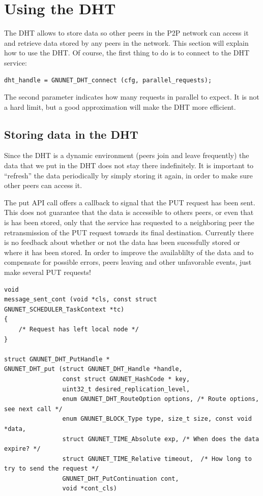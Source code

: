 \documentclass[10pt]{article}
\begin{document}
\section{Using the DHT}
The DHT allows to store data so other peers in the P2P network can
access it and retrieve data stored by any peers in the network.
This section will explain how to use the DHT. Of course, the first
thing to do is to connect to the DHT service:
\lstset{language=C}
\begin{lstlisting}
dht_handle = GNUNET_DHT_connect (cfg, parallel_requests);
\end{lstlisting}
The second parameter indicates how many requests in parallel to expect.
It is not a hard limit, but a good approximation will make the DHT more
efficient.

\subsection{Storing data in the DHT}
Since the DHT is a dynamic environment (peers join and leave frequently)
the data that we put in the DHT does not stay there indefinitely. It is
important to ``refresh'' the data periodically by simply storing it again,
in order to make sure other peers can access it.

The put API call offers a callback to signal that the PUT request has been
sent. This does not guarantee that the data is accessible to others peers,
or even that is has been stored, only that the service has requested to
a neighboring peer the retransmission of the PUT request towards its final
destination. Currently there is no feedback about whether or not the data
has been sucessfully stored or where it has been stored. In order to improve
the availablilty of the data and to compensate for possible errors, peers leaving
and other unfavorable events, just make several PUT requests!

\lstset{language=C}
\begin{lstlisting}
void
message_sent_cont (void *cls, const struct GNUNET_SCHEDULER_TaskContext *tc)
{
    /* Request has left local node */
}

struct GNUNET_DHT_PutHandle *
GNUNET_DHT_put (struct GNUNET_DHT_Handle *handle,
                const struct GNUNET_HashCode * key,
                uint32_t desired_replication_level,
                enum GNUNET_DHT_RouteOption options, /* Route options, see next call */
                enum GNUNET_BLOCK_Type type, size_t size, const void *data,
                struct GNUNET_TIME_Absolute exp, /* When does the data expire? */
                struct GNUNET_TIME_Relative timeout,  /* How long to try to send the request */
                GNUNET_DHT_PutContinuation cont,
                void *cont_cls)
\end{lstlisting}
\end{document}
